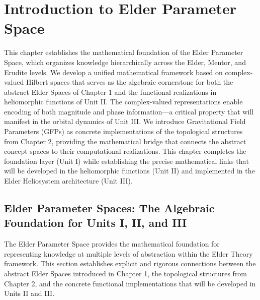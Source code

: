 \chapter{Introduction to Elder Parameter Space}

\begin{chapterabstract}
This chapter establishes the mathematical foundation of the Elder Parameter Space, which organizes knowledge hierarchically across the Elder, Mentor, and Erudite levels. We develop a unified mathematical framework based on complex-valued Hilbert spaces that serves as the algebraic cornerstone for both the abstract Elder Spaces of Chapter 1 and the functional realizations in heliomorphic functions of Unit II. The complex-valued representations enable encoding of both magnitude and phase information—a critical property that will manifest in the orbital dynamics of Unit III. We introduce Gravitational Field Parameters (GFPs) as concrete implementations of the topological structures from Chapter 2, providing the mathematical bridge that connects the abstract concept spaces to their computational realizations. This chapter completes the foundation layer (Unit I) while establishing the precise mathematical links that will be developed in the heliomorphic functions (Unit II) and implemented in the Elder Heliosystem architecture (Unit III).
\end{chapterabstract}

\section{Elder Parameter Spaces: The Algebraic Foundation for Units I, II, and III}

The Elder Parameter Space provides the mathematical foundation for representing knowledge at multiple levels of abstraction within the Elder Theory framework. This section establishes explicit and rigorous connections between the abstract Elder Spaces introduced in Chapter 1, the topological structures from Chapter 2, and the concrete functional implementations that will be developed in Units II and III.

